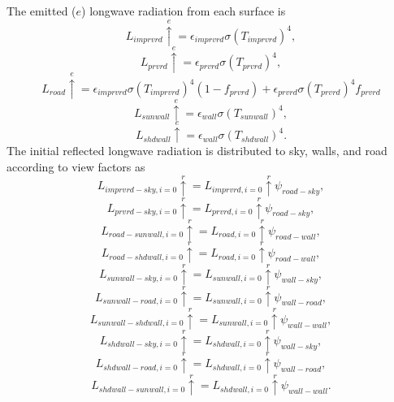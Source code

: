 \documentclass[12pt,authoryear]{elsarticle}
\numberwithin{equation}{section} %
\begin{document}
The emitted ($e$) longwave radiation from each surface is
\begin{equation}
L_{imprvrd}\overset{e}{\uparrow} = \epsilon_{imprvrd}\sigma (T_{imprvrd})^4,
\end{equation}
\begin{equation}
L_{prvrd}\overset{e}{\uparrow} = \epsilon_{prvrd} \sigma (T_{prvrd})^4,
\end{equation}
\begin{equation}
L_{road}\overset{e}{\uparrow}=\epsilon_{imprvrd}\sigma (T_{imprvrd})^4(1-f_{prvrd})+\epsilon_{prvrd}\sigma(T_{prvrd})^4f_{prvrd}
\end{equation}
\begin{equation}
L_{sunwall}\overset{e}{\uparrow}=\epsilon_{wall}\sigma (T_{sunwall})^4,
\end{equation}
\begin{equation}
L_{shdwall}\overset{e}{\uparrow}=\epsilon_{wall}\sigma (T_{shdwall})^4.
\end{equation}
The initial reflected longwave radiation is distributed to sky, walls, and road according to view factors as
\begin{equation}
L_{imprvrd-sky,i=0}\overset{r}{\uparrow} = L_{imprvrd,i=0}\overset{r}{\uparrow}\psi_{road-sky},
\end{equation}
\begin{equation}
L_{prvrd-sky,i=0}\overset{r}{\uparrow} = L_{prvrd,i=0}\overset{r}{\uparrow}\psi_{road-sky},
\end{equation}
\begin{equation}
L_{road-sunwall,i=0}\overset{r}{\uparrow} = L_{road,i=0}\overset{r}{\uparrow}\psi_{road-wall},
\end{equation}
\begin{equation}
L_{road-shdwall,i=0}\overset{r}{\uparrow} = L_{road,i=0}\overset{r}{\uparrow}\psi_{road-wall},
\end{equation}
\begin{equation}
L_{sunwall-sky,i=0}\overset{r}{\uparrow} = L_{sunwall,i=0}\overset{r}{\uparrow}\psi_{wall-sky},
\end{equation}
\begin{equation}
L_{sunwall-road,i=0}\overset{r}{\uparrow} = L_{sunwall,i=0}\overset{r}{\uparrow}\psi_{wall-road},
\end{equation}
\begin{equation}
L_{sunwall-shdwall,i=0}\overset{r}{\uparrow} = L_{sunwall,i=0}\overset{r}{\uparrow}\psi_{wall-wall},
\end{equation}
\begin{equation}
L_{shdwall-sky,i=0}\overset{r}{\uparrow} = L_{shdwall,i=0}\overset{r}{\uparrow}\psi_{wall-sky},
\end{equation}
\begin{equation}
L_{shdwall-road,i=0}\overset{r}{\uparrow} = L_{shdwall,i=0}\overset{r}{\uparrow}\psi_{wall-road},
\end{equation}
\begin{equation}
L_{shdwall-sunwall,i=0}\overset{r}{\uparrow} = L_{shdwall,i=0}\overset{r}{\uparrow}\psi_{wall-wall}.
\end{equation}
\end{document}

